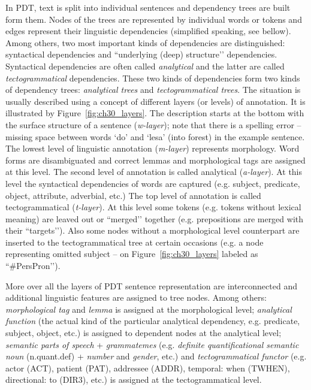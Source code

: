 In PDT, text is split into individual sentences and dependency trees are built form them. Nodes of the trees are represented by individual words or tokens and edges represent their linguistic dependencies (simplified speaking, see bellow). Among others, two most important kinds of dependencies are distinguished: syntactical dependencies and ``underlying (deep) structure’’ dependencies. Syntactical dependencies are often called \emph{analytical} and the latter are called \emph{tectogrammatical} dependencies. These two kinds of dependencies form two kinds of dependency trees: \emph{analytical trees} and \emph{tectogrammatical trees}. The situation is usually described using a concept of different layers (or levels) of annotation. It is illustrated by Figure~\ref{fig:ch30_layers}. The description starts at the bottom with the surface structure of a sentence (\emph{w-layer}); note that there is a spelling error -- missing space between words `do’ and `lesa’ (into forest) in the example sentence. The lowest level of linguistic annotation (\emph{m-layer}) represents morphology. Word forms are disambiguated and correct lemmas and morphological tags are assigned at this level. The second level of annotation is called analytical (\emph{a-layer}). At this level the syntactical dependencies of words are captured (e.g. subject, predicate, object, attribute, adverbial, etc.) The top level of annotation is called tectogrammatical (\emph{t-layer}). At this level some tokens (e.g. tokens without lexical meaning) are leaved out or ``merged’’ together (e.g. prepositions are merged with their ``targets’’). Also some nodes without a morphological level counterpart are inserted to the tectogrammatical tree at certain occasions (e.g. a node representing omitted subject -- on Figure~\ref{fig:ch30_layers} labeled as ``\#PersPron’’).  

More over all the layers of PDT sentence representation are interconnected and additional linguistic features are assigned to tree nodes. Among others: \emph{morphological tag} and \emph{lemma} is assigned at the morphological level; \emph{analytical function} (the actual kind of the particular analytical dependency, e.g. predicate, subject, object, etc.) is assigned to dependent nodes at the analytical level; \emph{semantic parts of speech} + \emph{grammatemes} (e.g. \emph{definite quantificational semantic noun} (n.quant.def) + \emph{number} and \emph{gender}, etc.) and \emph{tectogrammatical functor} (e.g. actor (ACT), patient (PAT), addressee (ADDR), temporal: when (TWHEN), directional: to (DIR3), etc.) is assigned at the tectogrammatical level. 

